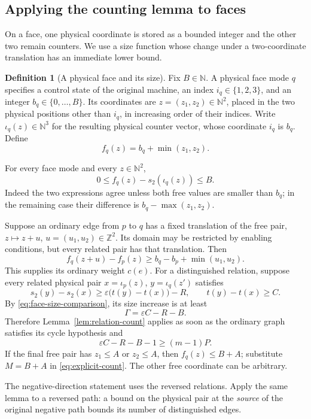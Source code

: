 \documentclass[11pt,a4paper]{article}
\theoremstyle{definition}
\newtheorem{definition}[theorem]{Definition}
\theoremstyle{remark}
\newcommand{\N}{\mathbb N}
\newcommand{\Z}{\mathbb Z}
\begin{document}
\subsection{Applying the counting lemma to faces}

On a face, one physical coordinate is stored as a bounded integer
and the other two remain counters. We use a size function whose
change under a two-coordinate translation has an immediate lower
bound.

\begin{definition}[A physical face and its size]\label{def:face-size}
Fix \(B\in\N\). A physical face mode \(q\) specifies a control state
of the original machine, an index \(i_q\in\{1,2,3\}\), and an integer
\(b_q\in\{0,\ldots,B\}\).
Its coordinates are \(z=(z_1,z_2)\in\N^2\), placed in the two physical
positions other than \(i_q\), in increasing order of their indices.
Write \(\iota_q(z)\in\N^3\) for the resulting physical counter vector,
whose coordinate \(i_q\) is \(b_q\). Define
\[
 f_q(z)=b_q+\min(z_1,z_2).
\]
\end{definition}

For every face mode and every \(z\in\N^2\),
\begin{equation}
 0\le f_q(z)-s_2(\iota_q(z))\le B.
 \label{eq:face-size-comparison}
\end{equation}
Indeed the two expressions agree unless both free values are smaller
than \(b_q\); in the remaining case their difference is
\(b_q-\max(z_1,z_2)\).

Suppose an ordinary edge from \(p\) to \(q\) has a fixed translation
of the free pair, \(z\mapsto z+u\), \(u=(u_1,u_2)\in\Z^2\).
Its domain may be restricted by enabling conditions, but every
related pair has that translation. Then
\[
 f_q(z+u)-f_p(z)
   \ge b_q-b_p+\min(u_1,u_2).
\]
This supplies its ordinary weight \(c(e)\).
For a distinguished relation, suppose every related physical pair
\(x=\iota_p(z)\), \(y=\iota_q(z')\) satisfies
\[
 s_2(y)-s_2(x)\ge\varepsilon\bigl(t(y)-t(x)\bigr)-R,
 \qquad t(y)-t(x)\ge C.
\]
By \eqref{eq:face-size-comparison}, its size increase is at least
\[
 \Gamma=\varepsilon C-R-B.
\]
Therefore Lemma~\ref{lem:relation-count} applies as soon as the
ordinary graph satisfies its cycle hypothesis and
\[
 \varepsilon C-R-B-1\ge(m-1)P.
\]
If the final free pair has \(z_1\le A\) or \(z_2\le A\), then
\(f_q(z)\le B+A\); substitute \(M=B+A\) in
\eqref{eq:explicit-count}. The other free coordinate can be arbitrary.

The negative-direction statement uses the reversed relations.
Apply the same lemma to a reversed path: a bound on the physical
pair at the \emph{source} of the original negative path bounds its
number of distinguished edges.
\end{document}
